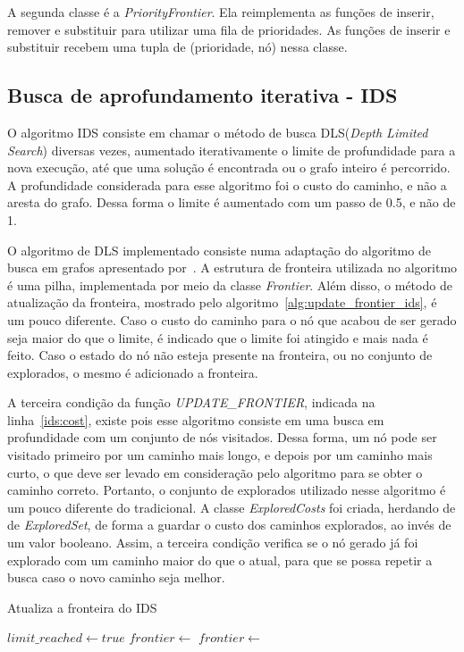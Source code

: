 A segunda classe é a \textit{PriorityFrontier}. Ela reimplementa as funções de inserir, remover e substituir para utilizar uma fila de prioridades. As funções de inserir e substituir recebem uma tupla de (prioridade, nó) nessa classe.

\subsection{Busca de aprofundamento iterativa - IDS}
O algoritmo IDS consiste em chamar o método de busca DLS(\textit{Depth Limited Search}) diversas vezes, aumentado iterativamente o limite de profundidade para a nova execução, até que uma solução é encontrada ou o grafo inteiro é percorrido. A profundidade considerada para esse algoritmo foi o custo do caminho, e não a aresta do grafo. Dessa forma o limite é aumentado com um passo de 0.5, e não de 1.

O algoritmo de DLS implementado consiste numa adaptação do algoritmo de busca em grafos apresentado por~\cite{russell2010artificial}. A estrutura de fronteira utilizada no algoritmo é uma pilha, implementada por meio da classe \textit{Frontier}. Além disso, o método de atualização da fronteira, mostrado pelo algoritmo~\ref{alg:update_frontier_ids}, é um pouco diferente. Caso o custo do caminho para o nó que acabou de ser gerado seja maior do que o limite, é indicado que o limite foi atingido e mais nada é feito. Caso o estado do nó não esteja presente na fronteira, ou no conjunto de explorados, o mesmo é adicionado a fronteira.

A terceira condição da função \textit{UPDATE\_FRONTIER}, indicada na linha~\ref{ids:cost}, existe pois esse algoritmo consiste em uma busca em profundidade com um conjunto de nós visitados. Dessa forma, um nó pode ser visitado primeiro por um caminho mais longo, e depois por um caminho mais curto, o que deve ser levado em consideração pelo algoritmo para se obter o caminho correto. Portanto, o conjunto de explorados utilizado nesse algoritmo é um pouco diferente do tradicional. A classe \textit{ExploredCosts} foi criada, herdando de de \textit{ExploredSet}, de forma a guardar o custo dos caminhos explorados, ao invés de um valor booleano. Assim, a terceira condição verifica se o nó gerado já foi explorado com um caminho maior do que o atual, para que se possa repetir a busca caso o novo caminho seja melhor.


\begin{algorithm}
\caption{Atualiza a fronteira do IDS}\label{alg:update_frontier_ids}
\begin{algorithmic}[1]
    	\State $limit\_reached \gets true$
    	\State $frontier \gets$ 
    \label{ids:cost}
    	\State $frontier \gets$ 
    \EndIf
\EndFunction
\end{algorithmic}
\end{algorithm}


